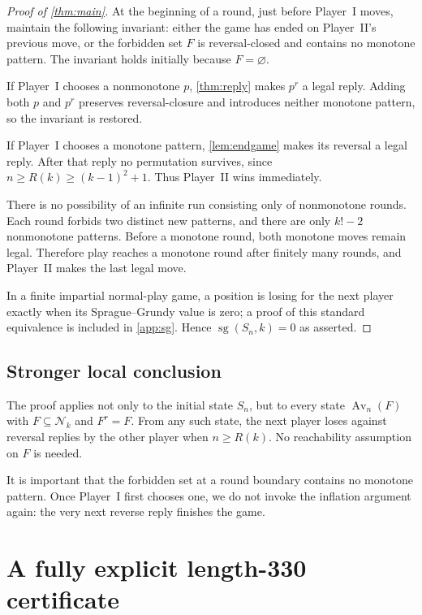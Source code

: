\documentclass[11pt,a4paper]{article}
\theoremstyle{definition}
\theoremstyle{remark}
\DeclareMathOperator{\Av}{Av}
\DeclareMathOperator{\sg}{sg}
\newcommand{\Nk}{\mathcal N_k}
\newcommand{\replybound}{R(k)}
\begin{document}
\begin{proof}[Proof of \cref{thm:main}]
At the beginning of a round, just before Player~I moves, maintain the
following invariant: either the game has ended on Player~II's previous
move, or the forbidden set $F$ is reversal-closed and contains no monotone
pattern. The invariant holds initially because $F=\varnothing$.

If Player~I chooses a nonmonotone $p$, \cref{thm:reply} makes $p^r$ a legal
reply. Adding both $p$ and $p^r$ preserves reversal-closure and introduces
neither monotone pattern, so the invariant is restored.

If Player~I chooses a monotone pattern, \cref{lem:endgame} makes its reversal
a legal reply. After that reply no permutation survives, since
$n\ge\replybound\ge(k-1)^2+1$. Thus Player~II wins immediately.

There is no possibility of an infinite run consisting only of nonmonotone
rounds. Each round forbids two distinct new patterns, and there are only
$k!-2$ nonmonotone patterns. Before a monotone round, both monotone moves
remain legal. Therefore play reaches a monotone round after finitely many
rounds, and Player~II makes the last legal move.

In a finite impartial normal-play game, a position is losing for the next
player exactly when its Sprague--Grundy value is zero; a proof of this
standard equivalence is included in \cref{app:sg}. Hence
$\sg(S_n,k)=0$ as asserted.
\end{proof}

\subsection{Stronger local conclusion}
The proof applies not only to the initial state $S_n$, but to every state
$\Av_n(F)$ with $F\subseteq\Nk$ and $F^r=F$. From any such state, the next
player loses against reversal replies by the other player when
$n\ge\replybound$. No reachability assumption on $F$ is needed.

It is important that the forbidden set at a round boundary contains no
monotone pattern. Once Player~I first chooses one, we do not invoke the
inflation argument again: the very next reverse reply finishes the game.

\section{A fully explicit length-330 certificate}
\label{sec:example330}
\end{document}
